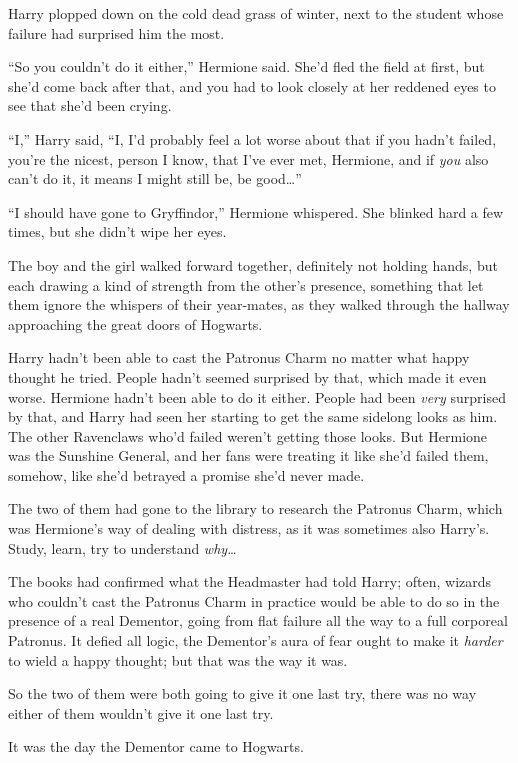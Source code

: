 Harry plopped down on the cold dead grass of winter, next to the student whose failure had surprised him the most.

“So you couldn’t do it either,” Hermione said. She’d fled the field at first, but she’d come back after that, and you had to look closely at her reddened eyes to see that she’d been crying.

“I,” Harry said, “I, I’d probably feel a lot worse about that if you hadn’t failed, you’re the nicest, person I know, that I’ve ever met, Hermione, and if \emph{you} also can’t do it, it means I might still be, be good…”

“I should have gone to Gryffindor,” Hermione whispered. She blinked hard a few times, but she didn’t wipe her eyes.

\later

The boy and the girl walked forward together, definitely not holding hands, but each drawing a kind of strength from the other’s presence, something that let them ignore the whispers of their year-mates, as they walked through the hallway approaching the great doors of Hogwarts.

Harry hadn’t been able to cast the Patronus Charm no matter what happy thought he tried. People hadn’t seemed surprised by that, which made it even worse. Hermione hadn’t been able to do it either. People had been \emph{very} surprised by that, and Harry had seen her starting to get the same sidelong looks as him. The other Ravenclaws who’d failed weren’t getting those looks. But Hermione was the Sunshine General, and her fans were treating it like she’d failed them, somehow, like she’d betrayed a promise she’d never made.

The two of them had gone to the library to research the Patronus Charm, which was Hermione’s way of dealing with distress, as it was sometimes also Harry’s. Study, learn, try to understand \emph{why…}

The books had confirmed what the Headmaster had told Harry; often, wizards who couldn’t cast the Patronus Charm in practice would be able to do so in the presence of a real Dementor, going from flat failure all the way to a full corporeal Patronus. It defied all logic, the Dementor’s aura of fear ought to make it \emph{harder} to wield a happy thought; but that was the way it was.

So the two of them were both going to give it one last try, there was no way either of them wouldn’t give it one last try.

It was the day the Dementor came to Hogwarts.

